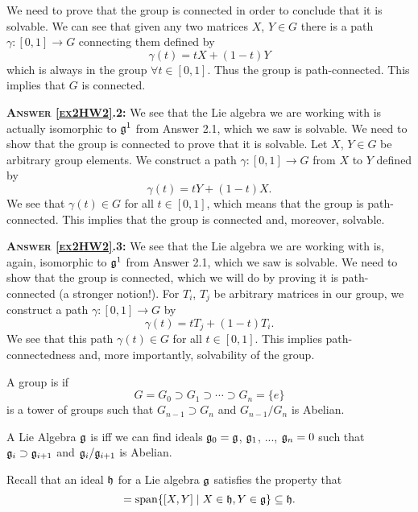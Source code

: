 We need to prove that the group is connected in order to conclude
that it is solvable. We can see that given any two matrices $X$,
$Y\in G$ there is a path $\gamma\colon[0,1]\to G$ connecting them
defined by
\begin{equation}
\gamma(t)=tX+(1-t)Y
\end{equation}
which is always in the group $\forall t\in[0,1]$. Thus the group
is path-connected. This implies that $G$ is connected.

\medbreak
\noindent\textsc{\textbf{Answer \ref{ex2HW2}.2:\enspace}}
We see that the Lie algebra we are working with is actually
isomorphic to $\frak{g}^{1}$ from Answer 2.1, which we saw is
solvable. We need to show that the group is connected to prove
that it is solvable. Let $X$, $Y\in G$ be arbitrary group
elements. We construct a path $\gamma\colon[0,1]\to G$ from $X$
to $Y$ defined by
\begin{equation}
\gamma(t)=tY+(1-t)X.
\end{equation}
We see that $\gamma(t)\in G$ for all $t\in[0,1]$, which means
that the group is path-connected. This implies that the group is
connected and, moreover, solvable.


\medbreak
\noindent\textsc{\textbf{Answer \ref{ex2HW2}.3:\enspace}}
We see that  the Lie algebra we are working with is, again,
isomorphic to $\frak{g}^{1}$ from Answer 2.1, which we saw is
solvable. We need to show that the group is connected, which we
will do by proving it is path-connected (a stronger notion!). For
$T_{i}$, $T_{j}$ be arbitrary matrices in our group, we construct
a path $\gamma\colon[0,1]\to G$ by
\begin{equation}
\gamma(t)=tT_{j}+(1-t)T_{i}.
\end{equation}
We see that this path $\gamma(t)\in G$ for all $t\in[0,1]$. This
implies path-connectedness and, more importantly, solvability of
the group.

\begin{defn}
A group is  if
\begin{equation}
G=G_{0}\supset G_{1}\supset\cdots\supset G_{n}=\{e\}
\end{equation}
is a tower of groups such that $G_{n-1}\supset G_{n}$ and
$G_{n-1}/G_{n}$ is Abelian.
\end{defn}
\begin{defn}
A Lie Algebra $\frak{g}$ is  iff we can find
ideals $\frak{g}_{0}=\frak{g}$, $\frak{g}_{1}$, ...,
$\frak{g}_{n}=0$ such that $\frak{g}_{i}\supset\frak{g}_{i+1}$
and $\frak{g}_{i}/\frak{g}_{i+1}$ is Abelian.
\end{defn}
Recall that an ideal $\frak{h}$ for a Lie algebra $\frak{g}$
satisfies the property that
\begin{equation}
[\frak{h},\frak{g}]=\mathop{\rm span}\nolimits\{[X,Y]\mid X\in\frak{h},Y\in\frak{g}\}\subseteq\frak{h}.
\end{equation}

